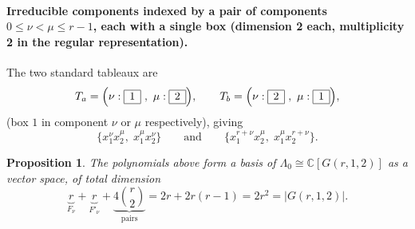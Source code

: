\documentclass[11pt,a4paper]{article}
\newtheorem{proposition}[theorem]{Proposition}
\begin{document}
\paragraph{Irreducible components indexed by a pair of components
$0\le \nu < \mu \le r-1$, each with a single box (dimension 2 each,
multiplicity 2 in the regular representation).} The two standard
tableaux are
\[
  T_a = \Big(\nu:\begin{array}{|c|}\hline 1\\\hline\end{array}
    \ ,\ \mu:\begin{array}{|c|}\hline 2\\\hline\end{array}\Big),
  \qquad
  T_b = \Big(\nu:\begin{array}{|c|}\hline 2\\\hline\end{array}
    \ ,\ \mu:\begin{array}{|c|}\hline 1\\\hline\end{array}\Big),
\]
(box $1$ in component $\nu$ or $\mu$ respectively), giving
\[
 \{x_1^{\nu}x_2^{\mu},\; x_1^{\mu}x_2^{\nu}\}
 \qquad\text{and}\qquad
 \{x_1^{r+\nu}x_2^{\mu},\; x_1^{\mu}x_2^{r+\nu}\}.
\]

\begin{proposition}\label{prop:Gr1n-basis}
The polynomials above form a basis of $\Lambda_0 \cong \mathbb{C}[G(r,1,2)]$
as a vector space, of total dimension
\[
 \underbrace{r}_{F_\nu} + \underbrace{r}_{F'_\nu}
 + \underbrace{4\binom{r}{2}}_{\text{pairs}}
 = 2r + 2r(r-1) = 2r^2 = |G(r,1,2)|.
\]
\end{proposition}
\end{document}
